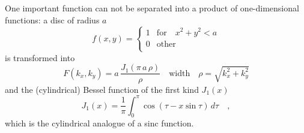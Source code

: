 One important function can not be separated into a product of one-dimensional functions: a disc of radius $a$
    \begin{equation}
    f(x,y)  = \left\{ 
    \begin{array}{ll}
    1 & \text{for} \quad x^2+y^2 < a \\
    0 & \text{other} \\
    \end{array}
    \right.
   \end{equation}
is transformed into 
\begin{equation}
  F(k_x, k_y) = a \, \frac{J_1(\pi \, a \, \rho )}{\rho}
  \quad \text{width} \quad \rho = \sqrt{k_x^2 + k_y^2}
\end{equation}
and the (cylindrical) Bessel function of the first kind $J_1(x)$
\begin{equation}
  J_1(x) = \frac{1}{\pi} \int_0^\pi \cos (\tau - x \sin \tau) \,d\tau \quad ,
\end{equation}
which is the cylindrical analogue of a sinc function.





\printbibliography[segment=\therefsegment,heading=subbibliography]
